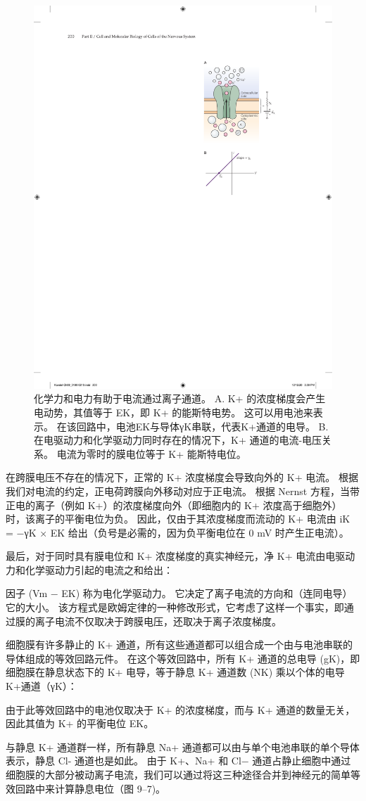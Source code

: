 \begin{figure}[htbp]
	\centering
	\includegraphics[width=0.5\linewidth]{chap09/fig_9_6}
	\caption{化学力和电力有助于电流通过离子通道。 A. K+ 的浓度梯度会产生电动势，其值等于 EK，即 K+ 的能斯特电势。 这可以用电池来表示。 在该回路中，电池EK与导体γK串联，代表K+通道的电导。 B. 在电驱动力和化学驱动力同时存在的情况下，K+ 通道的电流-电压关系。 电流为零时的膜电位等于 K+ 能斯特电位。}
	\label{fig:9_6}
\end{figure}


在跨膜电压不存在的情况下，正常的 K+ 浓度梯度会导致向外的 K+ 电流。
根据我们对电流的约定，正电荷跨膜向外移动对应于正电流。
根据 Nernst 方程，当带正电的离子（例如 K+）的浓度梯度向外（即细胞内的 K+ 浓度高于细胞外）时，该离子的平衡电位为负。
因此，仅由于其浓度梯度而流动的 K+ 电流由 iK = −γK × EK 给出（负号是必需的，因为负平衡电位在 0 mV 时产生正电流）。


最后，对于同时具有膜电位和 K+ 浓度梯度的真实神经元，净 K+ 电流由电驱动力和化学驱动力引起的电流之和给出：


因子 (Vm − EK) 称为电化学驱动力。
它决定了离子电流的方向和（连同电导）它的大小。
该方程式是欧姆定律的一种修改形式，它考虑了这样一个事实，即通过膜的离子电流不仅取决于跨膜电压，还取决于离子浓度梯度。


细胞膜有许多静止的 K+ 通道，所有这些通道都可以组合成一个由与电池串联的导体组成的等效回路元件。
在这个等效回路中，所有 K+ 通道的总电导 (gK)，即细胞膜在静息状态下的 K+ 电导，等于静息 K+ 通道数 (NK) 乘以个体的电导 K+通道（γK）：


由于此等效回路中的电池仅取决于 K+ 的浓度梯度，而与 K+ 通道的数量无关，因此其值为 K+ 的平衡电位 EK。


与静息 K+ 通道群一样，所有静息 Na+ 通道都可以由与单个电池串联的单个导体表示，静息 Cl- 通道也是如此。
由于 K+、Na+ 和 Cl− 通道占静止细胞中通过细胞膜的大部分被动离子电流，我们可以通过将这三种途径合并到神经元的简单等效回路中来计算静息电位（图 9–7)。


